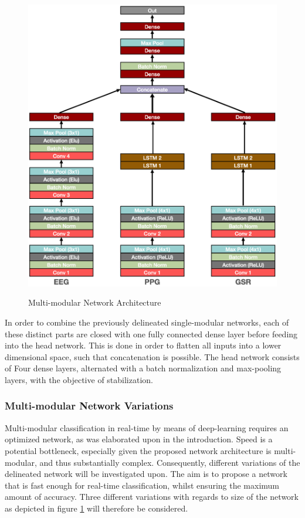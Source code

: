 \documentclass[12pt]{article}
\begin{document}
\begin{figure}
\caption{Multi-modular Network Architecture}
\bigskip
\includegraphics[scale=0.725]{multi_model_architecture}
\label{fig:multiarchitecture}
\end{figure}

In order to combine the previously delineated single-modular networks, each of these distinct parts are closed with one fully connected dense layer before feeding into the head network. This is done in order to flatten all inputs into a lower dimensional space, such that concatenation is possible. The head network consists of Four dense layers, alternated with a batch normalization and max-pooling layers, with the objective of stabilization. 

\subsubsection{Multi-modular Network Variations}
Multi-modular classification in real-time by means of deep-learning requires an optimized network, as was elaborated upon in the introduction. Speed is a potential bottleneck, especially given the proposed network architecture is multi-modular, and thus substantially complex. Consequently, different variations of the delineated network will be investigated upon. The aim is to propose a network that is fast enough for real-time classification, whilst ensuring the maximum amount of accuracy. Three different variations with regards to size of the network as depicted in figure \ref{fig:multiarchitecture} will therefore be considered.
\end{document}
